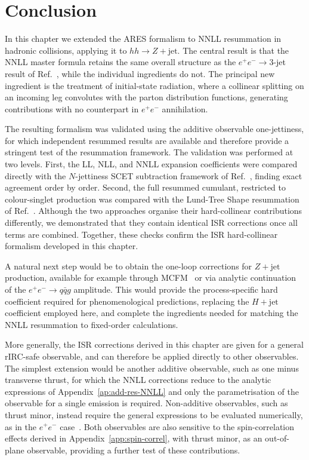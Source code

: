 \section{Conclusion}
\label{sec:conclusion}

In this chapter we extended the \textsc{ARES} formalism to NNLL resummation in
hadronic collisions, applying it to $hh\to Z+\text{jet}$. The central result is
that the NNLL master formula retains the same overall structure as the
$e^+e^-\to3$-jet result of Ref.~\cite{Arpino:2019ozn}, while the individual ingredients do not.
The principal new ingredient is the treatment of initial-state radiation, where a collinear
splitting on an incoming leg convolutes with the parton distribution functions,
generating contributions with no counterpart in $e^+e^-$ annihilation. 

The resulting formalism was validated using the additive observable
one-jettiness, for which independent resummed results are available and
therefore provide a stringent test of the resummation framework.
The validation was performed at two levels.
First, the LL, NLL, and NNLL expansion coefficients were compared
directly with the $N$-jettiness SCET subtraction framework of
Ref.~\cite{Gaunt:2015pea}, finding exact agreement order by order.
Second, the full resummed cumulant, restricted to colour-singlet
production was compared with the Lund-Tree Shape resummation of
Ref.~\cite{vanBeekveld:2025zjh}. Although the two approaches organise
their hard-collinear contributions differently, we demonstrated that
they contain identical ISR corrections once all terms are combined.
Together, these checks confirm the ISR hard-collinear formalism developed in this
chapter.

A natural next step would be to obtain the one-loop corrections for
$Z+\mathrm{jet}$ production, available for example through
\textsc{MCFM}~\cite{Campbell:1999ah,Campbell:2011bn,Campbell:2019dru} or via
analytic continuation of the $e^+e^-\to q\bar q g$ amplitude. This would
provide the process-specific hard coefficient required for phenomenological
predictions, replacing the $H+\mathrm{jet}$ coefficient employed here, and
complete the ingredients needed for matching the NNLL resummation to
fixed-order calculations.

More generally, the ISR corrections derived in this chapter are given for a general rIRC-safe observable, and can therefore be applied directly to other observables. The simplest extension would be another additive observable, such as one minus transverse thrust, for which the NNLL corrections reduce to the analytic expressions of Appendix~\ref{ap:add-res-NNLL} and only the parametrisation of the observable for a single emission is required. Non-additive observables, such as thrust minor, instead require the general expressions to be evaluated numerically, as in the $e^+e^-$ case~\cite{Banfi:2014sua}. Both observables are also sensitive to the spin-correlation effects derived in Appendix~\ref{app:spin-correl}, with thrust minor, as an out-of-plane observable, providing a further test of these contributions.

